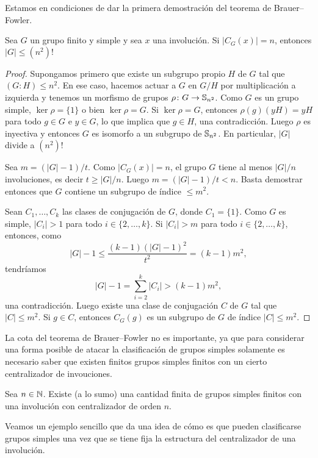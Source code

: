 Estamos en condiciones de dar la primera demostración del teorema de
Brauer--Fowler. 

\begin{theorem}
Sea $G$ un grupo finito y simple y sea $x$ una involución. Si $|C_G(x)|=n$, entonces $|G|\leq (n^2)!$	
\end{theorem}

\begin{proof}
Supongamos primero que existe un subgrupo propio $H$ de $G$ tal que
$(G:H)\leq n^2$. En ese caso, hacemos actuar a $G$ en $G/H$ por multiplicación a izquierda 
y tenemos un morfismo de grupos $\rho\colon G\to\mathbb{S}_{n^2}$. Como $G$ es un grupo simple, 
$\ker\rho=\{1\}$ o bien $\ker\rho=G$. Si $\ker\rho=G$, entonces $\rho(g)(yH)=yH$ para todo
$g\in G$ e $y\in G$, lo que implica que $g\in H$, una contradicción. Luego $\rho$ es inyectiva
y entonces $G$ es isomorfo a un subgrupo de $\mathbb{S}_{n^2}$. En particular, $|G|$ divide a $(n^2)!$

Sea $m=(|G|-1)/t$. 
Como $|C_G(x)|=n$, el grupo $G$ tiene al menos $|G|/n$ involuciones, es decir $t\geq |G|/n$. Luego
$m=(|G|-1)/t<n$. Basta demostrar entonces que $G$ contiene un subgrupo de índice $\leq m^2$. 

Sean $C_1,\dots,C_k$ las clases de conjugación de $G$, donde $C_1=\{1\}$. 
Como $G$ es simple, $|C_i|>1$ 
para todo $i\in\{2,\dots,k\}$.  
Si $|C_i|>m$ para todo $i\in\{2,\dots,k\}$, entonces, como
\[
|G|-1\leq\frac{(k-1)(|G|-1)^2}{t^2}=(k-1)m^2,
\]
tendríamos 
\[
|G|-1=\sum_{i=2}^k|C_i|>(k-1)m^2,
\]
una contradicción. Luego existe una clase de conjugación $C$ de $G$ tal que $|C|\leq m^2$. Si $g\in C$, entonces
$C_G(g)$ es un subgrupo de $G$ de índice $|C|\leq m^2$.
\end{proof}

La cota del teorema de Brauer--Fowler no es importante, ya que
para considerar una forma posible de atacar la clasificación de grupos simples 
solamente es necesario saber que existen  
finitos grupos simples finitos con un cierto centralizador de invouciones.

\begin{corollary}
Sea $n\in\mathbb{N}$. Existe (a lo sumo) una cantidad finita de grupos simples 
finitos con una involución con centralizador de orden $n$. 
\end{corollary}

Veamos un ejemplo sencillo que da una idea de cómo es que pueden clasificarse grupos simples
una vez que se tiene fija la estructura del centralizador de una involución. 

